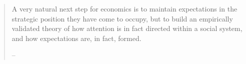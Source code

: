 \begin{quote}
	A very natural next step for economics is to maintain expectations in
	the strategic position they have come to occupy, but to build an
	empirically validated theory of how attention is in fact directed within
	a social system, and how expectations are, in fact, formed.

    \medskip
        \indent -- \href{https://econpapers.repec.org/RePEc:eee:jeborg:v:5:y:1984:i:1:p:35-55}{\cite{simon_behavioral_1984}}
\end{quote}
